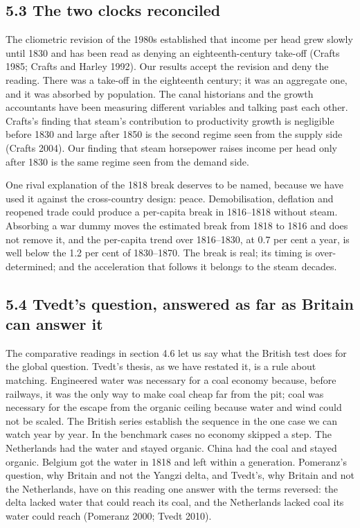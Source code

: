 \documentclass[
  11pt,
]{article}
\begin{document}
\subsection{5.3 The two clocks
reconciled}\label{the-two-clocks-reconciled}

The cliometric revision of the 1980s established that income per head
grew slowly until 1830 and has been read as denying an
eighteenth-century take-off (Crafts 1985; Crafts and Harley 1992). Our
results accept the revision and deny the reading. There was a take-off
in the eighteenth century; it was an aggregate one, and it was absorbed
by population. The canal historians and the growth accountants have been
measuring different variables and talking past each other. Crafts's
finding that steam's contribution to productivity growth is negligible
before 1830 and large after 1850 is the second regime seen from the
supply side (Crafts 2004). Our finding that steam horsepower raises
income per head only after 1830 is the same regime seen from the demand
side.

One rival explanation of the 1818 break deserves to be named, because we
have used it against the cross-country design: peace. Demobilisation,
deflation and reopened trade could produce a per-capita break in
1816--1818 without steam. Absorbing a war dummy moves the estimated
break from 1818 to 1816 and does not remove it, and the per-capita trend
over 1816--1830, at 0.7 per cent a year, is well below the 1.2 per cent
of 1830--1870. The break is real; its timing is over-determined; and the
acceleration that follows it belongs to the steam decades.

\subsection{5.4 Tvedt's question, answered as far as Britain can answer
it}\label{tvedts-question-answered-as-far-as-britain-can-answer-it}

The comparative readings in section 4.6 let us say what the British test
does for the global question. Tvedt's thesis, as we have restated it, is
a rule about matching. Engineered water was necessary for a coal economy
because, before railways, it was the only way to make coal cheap far
from the pit; coal was necessary for the escape from the organic ceiling
because water and wind could not be scaled. The British series establish
the sequence in the one case we can watch year by year. In the benchmark
cases no economy skipped a step. The Netherlands had the water and
stayed organic. China had the coal and stayed organic. Belgium got the
water in 1818 and left within a generation. Pomeranz's question, why
Britain and not the Yangzi delta, and Tvedt's, why Britain and not the
Netherlands, have on this reading one answer with the terms reversed:
the delta lacked water that could reach its coal, and the Netherlands
lacked coal its water could reach (Pomeranz 2000; Tvedt 2010).
\end{document}
